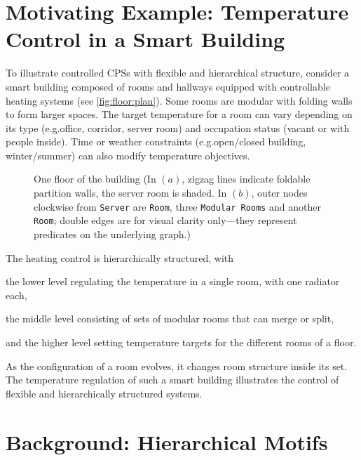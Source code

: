 \documentclass[runningheads]{llncs}
\makeatletter
\newenvironment{textlist}{\begin{enumerate*}[label=(\emph{\roman*})]}{\end{enumerate*}}
\newcommand{\mdash}[1][]{{#1}---{#1}}
\newcommand{\eg}[1][\@ ]{e.g.{#1}}
\newcommand{\nodename}[1]{\texttt{#1}}
\makeatother
\begin{document}
\section{Motivating Example: Temperature Control in a Smart Building}
\label{secn:example}

To illustrate controlled CPSs with flexible and hierarchical structure, consider a smart building composed of rooms and hallways equipped with controllable heating systems (see \cref{fig:floor:plan}).
Some rooms are modular with folding walls to form larger spaces. 
The target temperature for a room can vary depending on its type (\eg office, corridor, server room) and occupation status (vacant or with people inside). 
Time or weather constraints (\eg open/closed building, winter/summer) can also modify temperature objectives.

\begin{figure}[t]
  \centering
  \hspace{1cm}
%
  \caption{One floor of the building (In $(a)$, zigzag lines indicate foldable partition walls, the server room is shaded.  In $(b)$, outer nodes clockwise from \nodename{Server} are \nodename{Room}, three \nodename{Modular Rooms} and another \nodename{Room}; double edges are for visual clarity only\mdash they represent predicates on the underlying graph.)}
  \label{fig:floor}
\end{figure}

The heating control is hierarchically structured, with 
%
\begin{textlist}
\item\label{1room} the lower level regulating the temperature in a single room, with one radiator each, 
\item\label{set-of-rooms} the middle level consisting of sets of modular rooms that can merge or split, 
\item\label{building} and the higher level setting temperature targets for the different rooms of a floor.
\end{textlist}

As the configuration of a room evolves, it changes room structure inside its set. 
The temperature regulation of such a smart building illustrates the control of flexible and hierarchically structured systems. 

\section{Background: Hierarchical Motifs}
\label{secn:struct}
\end{document}
